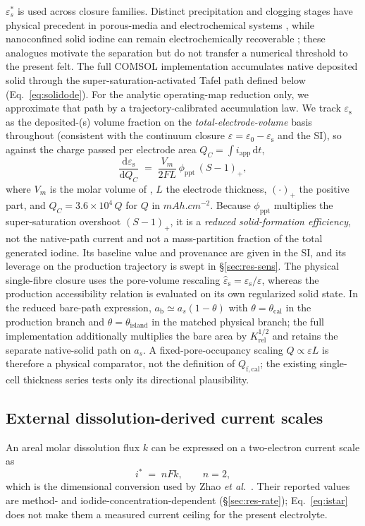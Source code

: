 \documentclass[11pt]{article}
\newcommand{\epss}{\varepsilon_{\mathrm{s}}}
\newcommand{\epsl}{\varepsilon}
\newcommand{\iapp}{i_{\mathrm{app}}}
\newcommand{\thetacal}{\theta_{\mathrm{cal}}}
\newcommand{\thetaisland}{\theta_{\mathrm{island}}}
\newcommand{\Qfcal}{Q_{\mathrm{f,cal}}}
\newcommand{\mAhcm}{\si{mAh.cm^{-2}}}
\begin{document}
$\varepsilon_s^*$ is used across closure families. Distinct precipitation and clogging stages have physical
precedent in porous-media and electrochemical systems \citep{PorosityClog_WRR2023,ZnO_EEM2024}, while
nanoconfined solid iodine can remain electrochemically recoverable \citep{SolidI2_NatCommun2020,Fitzek2023};
these analogues motivate the separation but do not transfer a numerical threshold to the present felt.
The full COMSOL implementation accumulates native deposited solid through the super-saturation-activated Tafel
path defined below (Eq.~\ref{eq:solidode}). For the analytic operating-map reduction only, we approximate that
path by a trajectory-calibrated accumulation law. We track $\epss$ as the deposited-(s) volume fraction
on the \emph{total-electrode-volume} basis throughout (consistent with the continuum closure
$\epsl=\varepsilon_0-\epss$ and the SI), so against the charge passed per electrode area
$Q_C=\int\iapp\,\mathrm{d}t$,
\begin{equation}
\frac{\mathrm{d}\epss}{\mathrm{d}Q_C} \;=\; \frac{V_m}{2F L}\,\phi_{\mathrm{ppt}}\,(S-1)_{+},
\label{eq:accum}
\end{equation}
where $V_m$ is the molar volume of , $L$ the electrode thickness, $(\cdot)_+$ the positive part, and
$Q_C=3.6\times10^4\,Q$ for $Q$ in $\mAhcm$. Because $\phi_{\mathrm{ppt}}$ multiplies the super-saturation
overshoot $(S-1)_+$, it is a \emph{reduced solid-formation efficiency}, not the native-path current and not a
mass-partition fraction of the total generated iodine. Its baseline value and provenance are given in the SI,
and its leverage on the production trajectory is swept in \S\ref{sec:res-sens}. The physical single-fibre
closure uses the pore-volume rescaling $\hat\epss=\epss/\epsl$, whereas the production accessibility relation
is evaluated on its own regularized solid state. In the reduced bare-path expression,
$a_{\mathrm b}\simeq a_s(1-\theta)$ with $\theta=\thetacal$ in the production branch and
$\theta=\thetaisland$ in the matched physical branch; the full implementation additionally multiplies the
bare area by $K_{\mathrm{rel}}^{1/2}$ and retains the separate native-solid path on $a_s$. A fixed-pore-occupancy scaling
$Q\propto\epsl L$ is therefore a physical comparator, not the definition of $\Qfcal$; the existing
single-cell thickness series tests only its directional plausibility.

\subsection{External dissolution-derived current scales}
\label{sec:diss}
An areal molar dissolution flux $k$ can be expressed on a two-electron current scale as
\begin{equation}
i^{*} \;=\; n F k, \qquad n=2,
\label{eq:istar}
\end{equation}
which is the dimensional conversion used by Zhao \emph{et al.}~\citep{Zhao2022}. Their reported values are
method- and iodide-concentration-dependent (\S\ref{sec:res-rate}); Eq.~\eqref{eq:istar} does not make them a
measured current ceiling for the present electrolyte.
\end{document}

